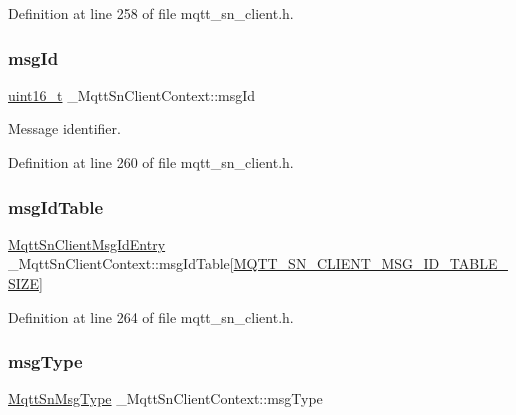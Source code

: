 Definition at line 258 of file mqtt\+\_\+sn\+\_\+client.\+h.

\mbox{\label{struct__MqttSnClientContext_a185b24e859e94aaeaf89537d6f284e9c}} 
\subsubsection{\texorpdfstring{msg\+Id}{msgId}}
{\footnotesize\ttfamily \hyperlink{stdint_8h_a273cf69d639a59973b6019625df33e30}{uint16\+\_\+t} \+\_\+\+Mqtt\+Sn\+Client\+Context\+::msg\+Id}



Message identifier. 



Definition at line 260 of file mqtt\+\_\+sn\+\_\+client.\+h.

\mbox{\label{struct__MqttSnClientContext_a70dc3314c5b9ff9adc1220029f80e7b0}} 
\subsubsection{\texorpdfstring{msg\+Id\+Table}{msgIdTable}}
{\footnotesize\ttfamily \hyperlink{structMqttSnClientMsgIdEntry}{Mqtt\+Sn\+Client\+Msg\+Id\+Entry} \+\_\+\+Mqtt\+Sn\+Client\+Context\+::msg\+Id\+Table\mbox{[}\hyperlink{mqtt__sn__client_8h_a720582816fcc2db4accc2fb95955c92c}{M\+Q\+T\+T\+\_\+\+S\+N\+\_\+\+C\+L\+I\+E\+N\+T\+\_\+\+M\+S\+G\+\_\+\+I\+D\+\_\+\+T\+A\+B\+L\+E\+\_\+\+S\+I\+ZE}\mbox{]}}



Definition at line 264 of file mqtt\+\_\+sn\+\_\+client.\+h.

\mbox{\label{struct__MqttSnClientContext_ac1323adf09e5971bb667b08a80378334}} 
\subsubsection{\texorpdfstring{msg\+Type}{msgType}}
{\footnotesize\ttfamily \hyperlink{mqtt__sn__common_8h_a0b5ccdae8aa73dc7c74ae2dfe62fd112}{Mqtt\+Sn\+Msg\+Type} \+\_\+\+Mqtt\+Sn\+Client\+Context\+::msg\+Type}



